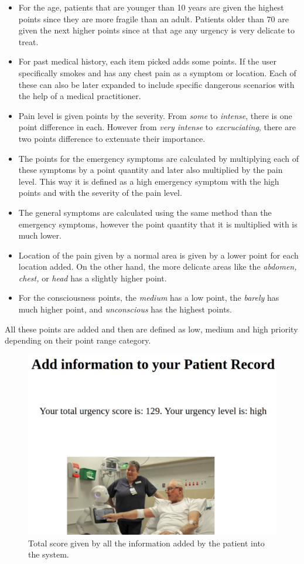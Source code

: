\documentclass[letterpaper]{article}
\begin{document}
\begin{itemize}
\item For the age, patients that are younger than 10 years are given the highest points since they are more fragile than an adult. Patients older than 70 are given the next higher points since at that age any urgency is very delicate to treat.

\item For past medical history, each item picked adds some points. If the user specifically smokes and has any chest pain as a symptom or location. Each of these can also be later expanded to include specific dangerous scenarios with the help of a medical practitioner.

\item Pain level is given points by the severity. From \textit{some} to \textit{intense}, there is one point difference in each. However from \textit{very intense} to \textit{excruciating}, there are two points difference to extenuate their importance.

\item The points for the emergency symptoms are calculated by multiplying each of these symptoms by a point quantity and later also multiplied by the pain level. This way it is defined as a high emergency symptom with the high points and with the severity of the pain level.

\item The general symptoms are calculated using the same method than the emergency symptoms, however the point quantity that it is multiplied with is much lower.

\item Location of the pain given by a normal area is given by a lower point for each location added. On the other hand, the more delicate areas like the \textit{abdomen, chest,} or \textit{head} has a slightly higher point.

\item For the consciousness points, the \textit{medium} has a low point, the \textit{barely} has much higher point, and \textit{unconscious} has the highest points.
\end{itemize}

All these points are added and then are defined as low, medium and high priority depending on their point range category.

\begin{figure}
  \centering
  \includegraphics[width=.35\textwidth]{RecordUrgencyScore.png}\hfill
   \caption{Total score given by all the information added by the patient into the system.}
\end{figure}
\end{document}
